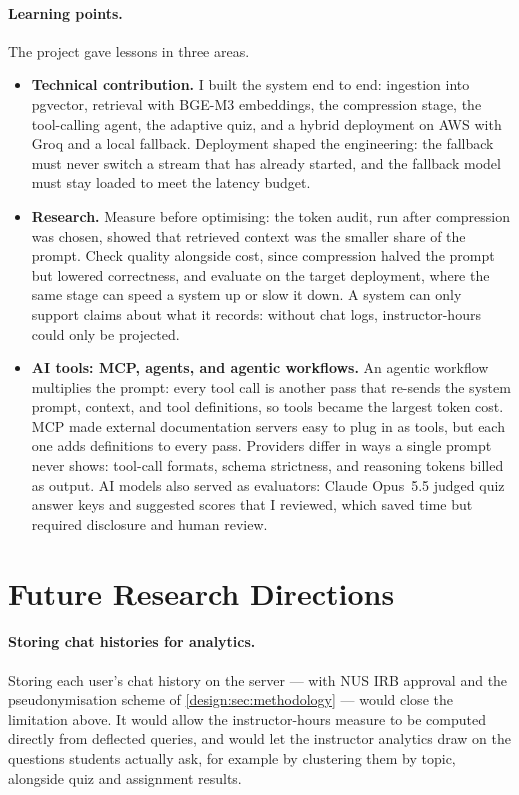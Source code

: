 \paragraph{Learning points.} The project gave lessons in three areas.
\begin{itemize}
  \item \textbf{Technical contribution.} I built the system end to end:
        ingestion into pgvector, retrieval with BGE-M3 embeddings, the
        compression stage, the tool-calling agent, the adaptive quiz, and a
        hybrid deployment on AWS with Groq and a local fallback. Deployment
        shaped the engineering: the fallback must never switch a stream that
        has already started, and the fallback model must stay loaded to meet
        the latency budget.
  \item \textbf{Research.} Measure before optimising: the token audit, run
        after compression was chosen, showed that retrieved context was the
        smaller share of the prompt. Check quality alongside cost, since
        compression halved the prompt but lowered correctness, and evaluate
        on the target deployment, where the same stage can speed a system up
        or slow it down. A system can only support claims about what it
        records: without chat logs, instructor-hours could only be
        projected.
  \item \textbf{AI tools: MCP, agents, and agentic workflows.} An agentic
        workflow multiplies the prompt: every tool call is another pass that
        re-sends the system prompt, context, and tool definitions, so tools
        became the largest token cost. MCP made external documentation
        servers easy to plug in as tools, but each one adds definitions to
        every pass. Providers differ in ways a single prompt never shows:
        tool-call formats, schema strictness, and reasoning tokens billed as
        output. AI models also served as evaluators: Claude Opus~5.5 judged
        quiz answer keys and suggested scores that I reviewed, which saved
        time but required disclosure and human review.
\end{itemize}

\section{Future Research Directions}

\paragraph{Storing chat histories for analytics.}
Storing each user's chat history on the server --- with NUS IRB approval
and the pseudonymisation scheme of \autoref{design:sec:methodology} --- would close the limitation above. It would allow the
instructor-hours measure to be computed directly from deflected queries, and
would let the instructor analytics draw on the questions students actually
ask, for example by clustering them by topic, alongside quiz and assignment results.


